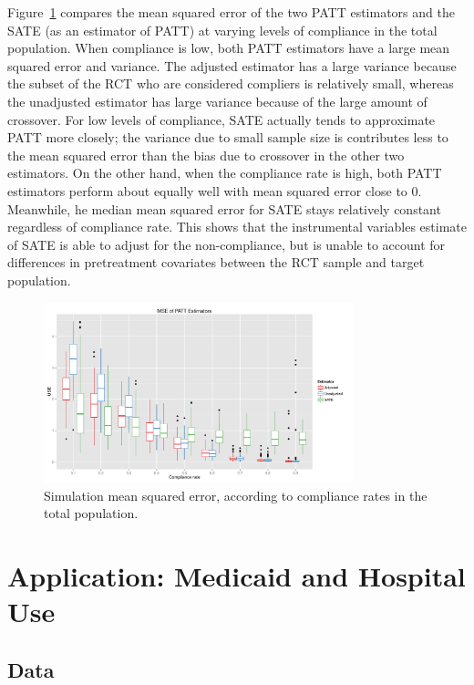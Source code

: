 \documentclass[12pt]{article}
\begin{document}
Figure~\ref{fig:sim_compliance} compares the mean squared error of the two PATT estimators and the SATE (as an estimator of PATT) at varying levels of compliance in the total population.  When compliance is low, both PATT estimators have a large mean squared error and variance.  The adjusted estimator has a large variance because the subset of the RCT who are considered compliers is relatively small, whereas the unadjusted estimator has large variance because of the large amount of crossover.  For low levels of compliance, SATE actually tends to approximate PATT more closely; the variance due to small sample size is contributes less to the mean squared error than the bias due to crossover in the other two estimators.  On the other hand, when the compliance rate is high, both PATT estimators perform about equally well with mean squared error close to $0$.  Meanwhile, he median mean squared error for SATE stays relatively constant regardless of compliance rate.  This shows that the instrumental variables estimate of SATE is able to adjust for the non-compliance, but is unable to account for differences in pretreatment covariates between the RCT sample and target population.

\begin{figure}[htbp]
\begin{center}
\includegraphics[width = 0.8\textwidth]{mse_boxplots_B5}
\caption{Simulation mean squared error, according to compliance rates in the total population.}
\label{fig:sim_compliance}
\end{center}
\end{figure}





\section{Application: Medicaid and Hospital Use}
\subsection{Data} \label{data}
\end{document}
